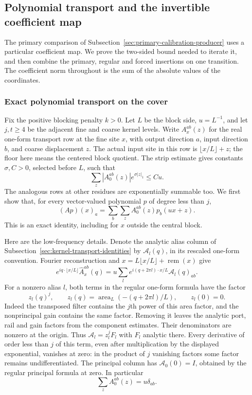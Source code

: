 \subsection{Polynomial transport and the invertible coefficient map}
\label{sec:heading-history-handoff}
The primary comparison of Subsection~\ref{sec:primary-calibration-producer}
uses a particular coefficient map. We prove the two-sided bound needed
to iterate it, and then combine the primary, regular and forced
insertions on one transition. The coefficient norm throughout is the
sum of the absolute values of the coordinates.

\subsubsection{Exact polynomial transport on the cover}
Fix the positive blocking penalty $k>0$. Let $L$ be the block side,
$u=L^{-1}$, and let $j,t\ge4$ be the
adjacent fine and coarse kernel levels. Write $A_x^{ab}(z)$ for the
real one-form transport row at the fine site $x$, with output direction
$a$, input direction $b$, and coarse displacement $z$. The actual
input site in this row is $\lfloor x/L\rfloor+z$; the floor here
means the centered block quotient. The strip estimate gives constants
$\sigma,C>0$, selected before $L$, such that
\[
 \sum_z |A_0^{ab}(z)|e^{\sigma|z|_1}\le Cu.
\]
The analogous rows at other residues are exponentially summable too.
We first show that, for every vector-valued polynomial $p$ of degree
less than $j$,
\begin{equation}\label{eq:heading-polynomial-row}
 (Ap)(x)_a=\sum_b\sum_z A_0^{ab}(z)p_b(ux+z).
\end{equation}
This is an exact identity, including for $x$ outside the central block.

Here are the low-frequency details. Denote the analytic alias column
of Subsection~\ref{sec:kernel-transport-identities} by $\mathcal A_l(q)$,
in its rescaled one-form convention. Fourier reconstruction and
$x=L\lfloor x/L\rfloor+\operatorname{rem}(x)$ give
\[
 e^{iq\cdot\lfloor x/L\rfloor}\widehat A_x^{ab}(q)
 =u\sum_l e^{i(q+2\pi l)\cdot x/L}\mathcal A_l(q)_{ab}.
\]
For a nonzero alias $l$, both terms in the regular one-form formula
have the factor
\[
 z_l(q)^j,\qquad
 z_l(q)=\operatorname{area}_L(-(q+2\pi l)/L),\qquad z_l(0)=0.
\]
Indeed the transposed filter contains the $j$th power of this area
factor, and the nonprincipal gain contains the same factor. Removing
it leaves the analytic port, rail and gain factors from the component
estimates. Their denominators are nonzero at the origin. Thus
$\mathcal A_l=z_l^j F_l$ with $F_l$ analytic there. Every derivative
of order less than $j$ of this term, even after multiplication by
the displayed exponential, vanishes at zero: in the product of $j$
vanishing factors some factor remains undifferentiated. The principal
column has $\mathcal A_0(0)=I$, obtained by the regular principal
formula at zero. In particular
\begin{equation}\label{eq:heading-row-mass}
                       \sum_z A_0^{ab}(z)=u\delta_{ab}.
\end{equation}

